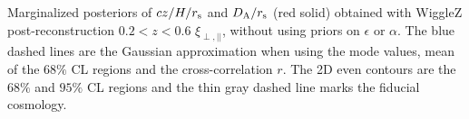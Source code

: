 \label{fig:HDA_z26_noprior} Marginalized posteriors of $cz/H/r_{\rm s}$ and $D_{\rm A}/r_{\rm s}$ (red solid) obtained with WiggleZ post-reconstruction $0.2<z<0.6$ $\xi_{\perp, ||}$, without using priors on $\epsilon$ or $\alpha$. The blue dashed lines are the Gaussian approximation when using the mode values, mean of the 68$\%$ CL regions and the cross-correlation $r$. The 2D even contours are the $68\%$ and $95\%$ CL regions and the thin gray dashed line marks the fiducial cosmology.